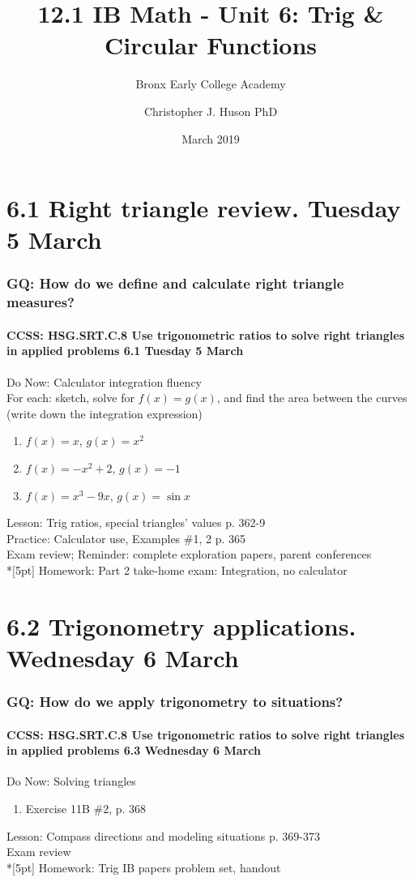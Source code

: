 \documentclass{beamer}
\title{12.1 IB Math - Unit 6: Trig \& Circular Functions}
\subtitle{Bronx Early College Academy}
\author{Christopher J. Huson PhD}
\date{March 2019}
\begin{document}
\frame{\titlepage}

\section[Outline]{}
\frame{\tableofcontents}

\section{6.1 Right triangle review. Tuesday 5 March}
  \frame
  {
    \frametitle{GQ: How do we define and calculate right triangle measures?}
    \framesubtitle{CCSS: HSG.SRT.C.8 Use trigonometric ratios to solve right triangles in applied problems \hfill \alert{6.1 Tuesday 5 March}}

    \begin{block}{Do Now: Calculator integration fluency\\For each: sketch, solve for $f(x)=g(x)$, and find the area between the curves (write down the integration expression)}
    \begin{enumerate}
      \item $f(x)=x$, $g(x)=x^2$
      \item $f(x)=-x^2+2$, $g(x)=-1$
      \item $f(x)=x^3-9x$, $g(x)=\sin x$
    \end{enumerate}
    \end{block}
    Lesson: Trig ratios, special triangles' values p. 362-9\\
    Practice: Calculator use, Examples \#1, 2  p. 365\\
    Exam review; 
    Reminder: complete exploration papers, \alert{parent conferences} \\*[5pt]
    Homework: Part 2 take-home exam: Integration, no calculator
  }

\section{6.2 Trigonometry applications. Wednesday 6 March}
  \frame
  {
    \frametitle{GQ: How do we apply trigonometry to situations?}
    \framesubtitle{CCSS: HSG.SRT.C.8 Use trigonometric ratios to solve right triangles in applied problems \hfill \alert{6.3 Wednesday 6 March}}

    \begin{block}{Do Now: Solving triangles}
    \begin{enumerate}
        \item Exercise 11B \#2, p. 368
    \end{enumerate}
    \end{block}
    Lesson: Compass directions and modeling situations p. 369-373\\
    Exam review\\*[5pt]
    Homework: Trig IB papers problem set, handout
  }
\end{document}
